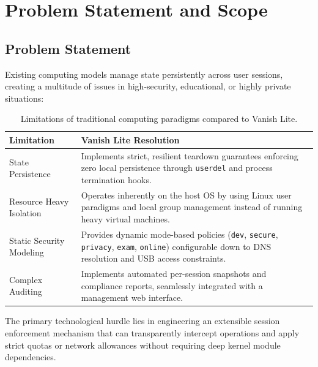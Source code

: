 \chapter{Problem Statement and Scope}

\section{Problem Statement}
Existing computing models manage state persistently across user sessions, creating a multitude of issues in high-security, educational, or highly private situations:
\begin{table}[h]
    \centering
    \begin{tabularx}{\textwidth}{lX}
    \toprule
    \textbf{Limitation} & \textbf{Vanish Lite Resolution} \\
    \midrule
    State Persistence & Implements strict, resilient teardown guarantees enforcing zero local persistence through \texttt{userdel} and process termination hooks. \\
    Resource Heavy Isolation & Operates inherently on the host OS by using Linux user paradigms and local group management instead of running heavy virtual machines. \\
    Static Security Modeling & Provides dynamic mode-based policies (\texttt{dev}, \texttt{secure}, \texttt{privacy}, \texttt{exam}, \texttt{online}) configurable down to DNS resolution and USB access constraints. \\
    Complex Auditing & Implements automated per-session snapshots and compliance reports, seamlessly integrated with a management web interface. \\
    \bottomrule
    \end{tabularx}
    \caption{Limitations of traditional computing paradigms compared to Vanish Lite.}
    \label{tab:limitations}
\end{table}

The primary technological hurdle lies in engineering an extensible session enforcement mechanism that can transparently intercept operations and apply strict quotas or network allowances without requiring deep kernel module dependencies.

